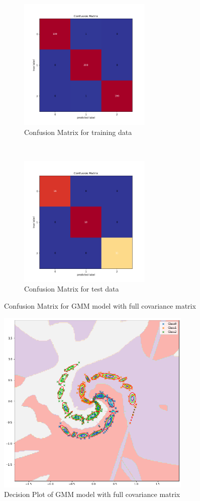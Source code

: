 \begin{figure}[!ht]
    \centering
    \begin{subfigure}[t]{0.5\textwidth}
        \centering
        \includegraphics[height=2.5in]{Dataset_1b/GMM_10_cmatrix_train_data_non_diag.png}
        \caption{Confusion Matrix for training data}
    \end{subfigure}%
    ~ 
    \begin{subfigure}[t]{0.5\textwidth}
        \centering
        \includegraphics[height=2.5in]{Dataset_1b/GMM_10_cmatrix_test_data_non_diag.png}
        \caption{Confusion Matrix for test data}
    \end{subfigure}%
    
    \caption{Confusion Matrix for GMM model with full covariance matrix}
    \label{fig:21}
\end{figure}

\begin{figure}[!ht]
    \centering
    \includegraphics[height=3.5in]{Dataset_1b/GMM_10_decision_plot_non_diag.png}
    \caption{Decision Plot of GMM model with full covariance matrix}
    \label{fig:22}
\end{figure}

